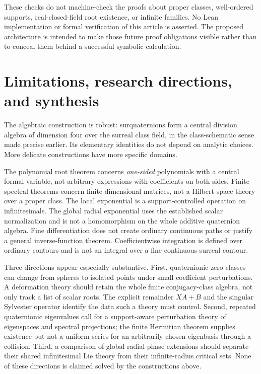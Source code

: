 \documentclass[11pt,letterpaper]{article}
\theoremstyle{definition}
\begin{document}
These checks do not machine-check the proofs about proper classes,
well-ordered supports, real-closed-field root existence, or infinite families.
No Lean implementation or formal verification of this article is asserted.
The proposed architecture is intended to make those future proof obligations
visible rather than to conceal them behind a successful symbolic calculation.

\section{Limitations, research directions, and synthesis}
\label{sec:conclusion}
The algebraic construction is robust: surquaternions form a central division
algebra of dimension four over the surreal class field, in the class-schematic
sense made precise earlier. Its elementary identities do not depend on
analytic choices. More delicate constructions have more specific domains.

The polynomial root theorem concerns \emph{one-sided} polynomials with a
central formal variable, not arbitrary expressions with coefficients on both
sides. Finite spectral theorems concern finite-dimensional matrices, not a
Hilbert-space theory over a proper class. The local exponential is a
support-controlled operation on infinitesimals. The global radial exponential
uses the established scalar normalization and is not a homomorphism on the
whole additive quaternion algebra. Fine differentiation does not create
ordinary continuous paths or justify a general inverse-function theorem.
Coefficientwise integration is defined over ordinary contours and is not an
integral over a fine-continuous surreal contour.

Three directions appear especially substantive. First, quaternionic zero
classes can change from spheres to isolated points under small coefficient
perturbations. A deformation theory should retain the whole finite
conjugacy-class algebra, not only track a list of scalar roots. The explicit
remainder $XA+B$ and the singular Sylvester operator identify the data such a
theory must control. Second, repeated quaternionic eigenvalues call for a
support-aware perturbation theory of eigenspaces and spectral projections;
the finite Hermitian theorem supplies existence but not a uniform series for
an arbitrarily chosen eigenbasis through a collision. Third, a comparison of
global radial phase extensions should separate their shared infinitesimal
Lie theory from their infinite-radius critical sets. None of these directions
is claimed solved by the constructions above.
\end{document}

